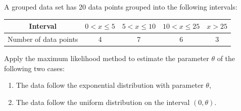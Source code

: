 \begin{example}
    A grouped data set has 20 data points grouped into the following intervals:
    \begin{table}[h!]
    \centering
    \begin{tabular}{|c|c|c|c|c|}
    \hline
    Interval & $0 < x \leq 5$ & $5 < x \leq 10$ & $10 < x \leq 25$ & $x > 25$ \\
    \hline
    Number of data points & 4 & 7 & 6 & 3 \\
    \hline
    \end{tabular}
    \end{table}

    \begin{figure}[ht]
    \centering
    \end{figure}
    
    Apply the maximum likelihood method to estimate the parameter $\theta$ of the following two cases:
    
    \begin{enumerate}
        \item The data follow the exponential distribution with parameter $\theta$,
        \item The data follow the uniform distribution on the interval $(0, \theta)$.
    \end{enumerate}
\end{example}
